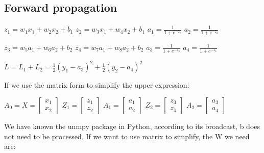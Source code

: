 \documentclass[10pt]{article}
\begin{document}
     \subsection*{Forward propagation}
     \begin{flushleft}
        $z_{1} = w_{1}x_{1} + w_{2}x_{2} + b_1$ \quad $z_{2} = w_{3}x_{1} + w_{4}x_{2} + b_1$ \quad $a_{1} = \frac{1}{1+e^{-z_{1}}}$ \quad $a_{2} = \frac{1}{1+e^{-z_{2}}}$\vspace{1ex}

        $z_{3} = w_{5}a_{1} + w_{6}a_{2} + b_2$ \quad $z_{4} = w_{7}a_{1} + w_{8}a_{2} + b_2$ \quad $a_{3} = \frac{1}{1+e^{-z_{3}}}$ \quad $a_{4} = \frac{1}{1+e^{-z_{4}}}$\vspace{1ex}

        $L = L_1 + L_2 = \frac{1}{2}(y_1 - a_3)^2 +  \frac{1}{2}(y_2 - a_4)^2$ \vspace{3ex}

        If we use the matrix form to simplify the upper expression:\vspace{3ex}
        
        \begin{center}
        $A_0 = X = \begin{bmatrix}
            x_1 \\
            x_2
        \end{bmatrix}$ \quad
        $Z_1 = \begin{bmatrix}
            z_1 \\
            z_2
        \end{bmatrix}$ \quad
        $A_1 = \begin{bmatrix}
            a_1 \\
            a_2
        \end{bmatrix}$ \quad
        $Z_2 = \begin{bmatrix}
            z_3 \\
            z_4
        \end{bmatrix}$ \quad
        $A_2 = \begin{bmatrix}
            a_3 \\
            a_4
        \end{bmatrix}$ \vspace{3ex}
        \end{center}

        We have known the unmpy package in Python, according to its broadcast, b does not need to be processed. If we want to use matrix to simplify, the W we need are: \vspace{3ex}


\end{flushleft}
\end{document}

